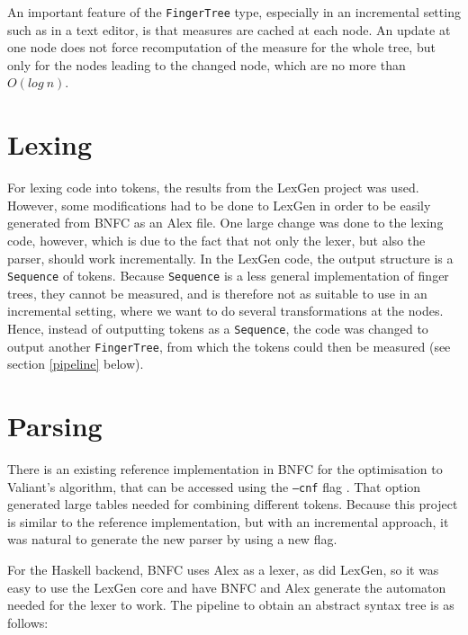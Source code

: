 \documentclass[a4paper,12pt,twosided]{report}
\renewcommand\cite{\citep}
\begin{document}
An important feature of the \texttt{FingerTree} type, especially in an incremental
setting such as in a text editor, is that measures are cached at each node. An
update at one node does not force recomputation of the measure for the whole
tree, but only for the nodes leading to the changed node, which are no more than
$O(log\ n)$. 

\section{Lexing}
For lexing code into tokens, the results from the LexGen project was used.
However, some modifications had to be done to LexGen in order to be easily
generated from BNFC as an Alex file. One large change was done to the lexing
code, however, which is due to the fact that not only the lexer, but also the
parser, should work incrementally. In the LexGen code, the output structure is a
\texttt{Sequence} of tokens. Because \texttt{Sequence} is a less general
implementation of finger trees, they cannot be measured, and is therefore not as
suitable to use in an incremental setting, where we want to do several
transformations at the nodes. Hence, instead of outputting tokens
as a \texttt{Sequence}, the code was changed to output another
\texttt{FingerTree}, from which the tokens could then be measured (see section
\ref{pipeline} below).

\section{Parsing}
There is an existing reference implementation in BNFC for the optimisation to
Valiant's algorithm, that can be accessed using the \texttt{---cnf} flag
\cite{parparsepaper}.  That option generated large tables needed for combining
different tokens. Because this project is similar to the reference
implementation, but with an incremental approach, it was natural to generate the
new parser by using a new flag.

For the Haskell backend, BNFC uses Alex as a lexer, as did LexGen, so it was
easy to use the LexGen core and have BNFC and Alex generate the automaton needed for
the lexer to work. The pipeline to obtain an abstract syntax tree is as follows:
\end{document}

